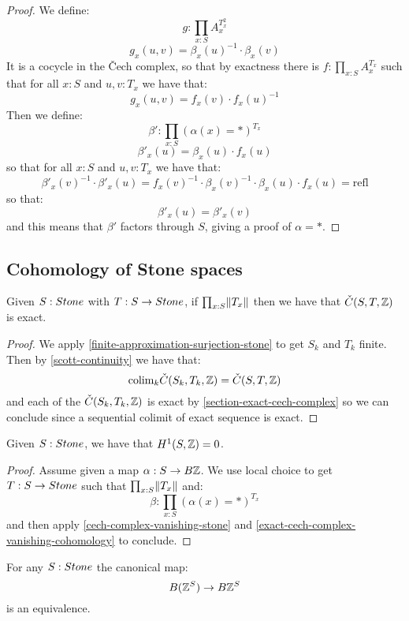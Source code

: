 \begin{proof}
We define:
\[g : \prod_{x:S} A_x^{T_x^2}\]
\[g_x(u,v) = \beta_x(u)^{-1}\cdot\beta_x(v)\] 
It is a cocycle in the \v{C}ech complex, so that by exactness there is $f:\prod_{x:S}A_x^{T_x}$ such that for all $x:S$ and $u,v:T_x$ we have that:
\[g_x(u,v)=f_x(v)\cdot f_x(u)^{-1}\]
Then we define:
\[\beta' : \prod_{x:S}(\alpha(x)=*)^{T_x}\]
\[\beta'_x(u) = \beta_x(u)\cdot f_x(u)\]
so that for all $x:S$ and $u,v:T_x$ we have that:
\[\beta'_x(v)^{-1}\cdot\beta'_x(u) = f_x(v)^{-1}\cdot\beta_x(v)^{-1}\cdot\beta_x(u)\cdot f_x(u) = \mathrm{refl}\]
so that:
\[\beta'_x(u)=\beta'_x(v)\]
and this means that $\beta'$ factors through $S$, giving a proof of $\alpha = *$.
\end{proof}


\subsection{Cohomology of Stone spaces}

\begin{lemma}\label{cech-complex-vanishing-stone}
Given $S:\Stone$ with $T:S\to\Stone$, if $\prod_{x:S}\lVert T_x \rVert$ then we have that $\check{C}(S,T,\mathbb{Z})$ is exact.
\end{lemma}

\begin{proof}
We apply \cref{finite-approximation-surjection-stone} to get $S_k$ and $T_k$ finite. Then by \cref{scott-continuity} we have that:
\[\mathrm{colim}_k \check{C}(S_k,T_k,\mathbb{Z}) = \check{C}(S,T,\mathbb{Z})\]
and each of the $\check{C}(S_k,T_k,\mathbb{Z})$ is exact by \cref{section-exact-cech-complex} so we can conclude since a sequential colimit of exact sequence is exact.
\end{proof}

\begin{lemma}\label{eilenberg-stone-vanish}
Given $S:\Stone$, we have that $H^1(S,\mathbb{Z}) = 0$. 
\end{lemma}

\begin{proof}
Assume given a map $\alpha:S\to B\mathbb{Z}$. We use local choice to get $T:S\to\Stone$ such that $\prod_{x:S}\lVert T_x \rVert$ and:
\[\beta:\prod_{x:S}(\alpha(x)=*)^{T_x}\]
and then apply \cref{cech-complex-vanishing-stone} and \cref{exact-cech-complex-vanishing-cohomology} to conclude.
\end{proof}

\begin{corollary}\label{stone-commute-delooping}
For any $S:\Stone$ the canonical map:
\[B(\mathbb{Z}^S) \to B\mathbb{Z}^S\]
is an equivalence.
\end{corollary}


